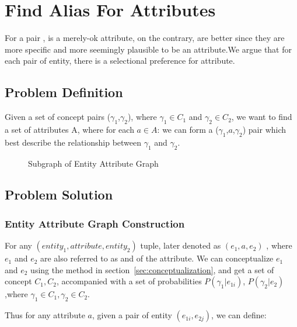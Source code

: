 
\section{Find Alias For Attributes}

For a pair ,  is a merely-ok attribute, on the contrary,  are better since they are more specific and more seemingly plausible to be an attribute.We argue that for each pair of entity, there is a selectional preference for attribute.

\subsection{Problem Definition}
Given a set of concept pairs ($\gamma_1$,$\gamma_2$), where $\gamma_1\in C_1$ and $\gamma_2\in C_2$, we want to find a set of attributes A, where for each $a \in A$:
we can form a ($\gamma_1$,$a$,$\gamma_2$) pair which best describe the relationship between $\gamma_1$ and $\gamma_2$.

 
\begin{figure}[!htb]
\centering {}
\caption{Subgraph of Entity Attribute Graph } \label{fig:eag}
\end{figure}


\subsection{Problem Solution}

\subsubsection{Entity Attribute Graph Construction}

For any $(entity_1, attribute, entity_2)$ tuple, later denoted as  $(e_1, a, e_2)$ , where $e_1$ and $e_2$ are also referred to as  and  of the attribute. We can conceptualize $e_1$ and $e_2$ using the method in section~\ref{sec:conceptualization}, and get a set of concept $C_1,C_2$, accompanied with a set of probabilities $P(\gamma_{1}|e_{1i})$, $P(\gamma_{2}|e_2)$,where ${\gamma_{1} \in C_1},{\gamma_{2} \in C_2}$.


Thus for any attribute $a$, given a pair of entity $(e_{1i},e_{2j})$, we can define:

